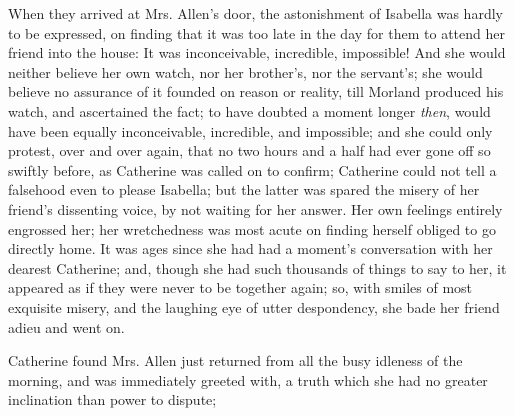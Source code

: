 When they arrived at Mrs. Allen's door, the astonishment of Isabella was hardly to be expressed, on finding that it was too late in the day for them to attend her friend into the house:  It was inconceivable, incredible, impossible! And she would neither believe her own watch, nor her brother's, nor the servant's; she would believe no assurance of it founded on reason or reality, till Morland produced his watch, and ascertained the fact; to have doubted a moment longer {\em then}, would have been equally inconceivable, incredible, and impossible; and she could only protest, over and over again, that no two hours and a half had ever gone off so swiftly before, as Catherine was called on to confirm; Catherine could not tell a falsehood even to please Isabella; but the latter was spared the misery of her friend's dissenting voice, by not waiting for her answer. Her own feelings entirely engrossed her; her wretchedness was most acute on finding herself obliged to go directly home. It was ages since she had had a moment's conversation with her dearest Catherine; and, though she had such thousands of things to say to her, it appeared as if they were never to be together again; so, with smiles of most exquisite misery, and the laughing eye of utter despondency, she bade her friend adieu and went on.

Catherine found Mrs. Allen just returned from all the busy idleness of the morning, and was immediately greeted with,  a truth which she had no greater inclination than power to dispute; 









